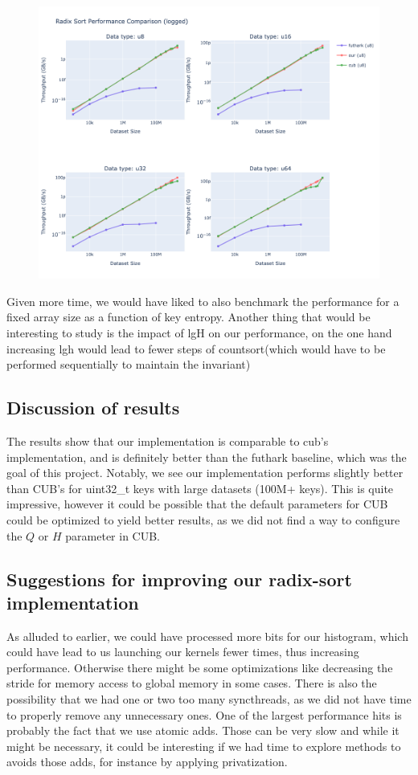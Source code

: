 \documentclass{article}
\begin{document}
\begin{figure}[h]
\includegraphics[width=1\textwidth]{images/combined_logged_benchmarks.png}
\end{figure}

Given more time, we would have liked to also benchmark the performance for a fixed array size as a function of key entropy.
Another thing that would be interesting to study is the impact of lgH on our performance, on the one hand increasing lgh would lead to fewer steps of countsort(which would have to be performed sequentially to maintain the invariant)


\subsection{Discussion of results}
The results show that our implementation is comparable to cub's implementation, and is definitely better than the futhark baseline, which was the goal of this project. Notably, we see our implementation performs slightly better than CUB's for uint32\_t keys with large datasets (100M+ keys). This is quite impressive, however it could be possible that the default parameters for CUB could be optimized to yield better results, as we did not find a way to configure the $Q$ or $H$ parameter in CUB. 

\subsection{Suggestions for improving our radix-sort implementation}
As alluded to earlier, we could have processed more bits for our histogram, which could have lead to us launching our kernels fewer times, thus increasing performance. Otherwise there might be some optimizations like decreasing the stride for memory access to global memory in some cases. There is also the possibility that we had one or two too many syncthreads, as we did not have time to properly remove any unnecessary ones. One of the largest performance hits is probably the fact that we use atomic adds. Those can be very slow and while it might be necessary, it could be interesting if we had time to explore methods to avoids those adds, for instance by applying privatization.
\end{document}
